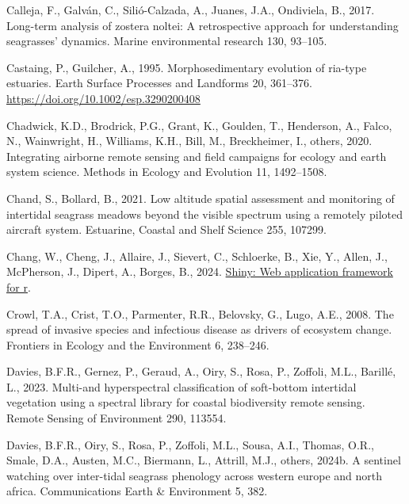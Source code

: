 \documentclass[
  letterpaper,
  DIV=11,
  numbers=noendperiod]{scrartcl}
\newlength{\cslhangindent}
\newenvironment{CSLReferences}[2] %
 {\begin{list}{}{%
  \setlength{\itemindent}{0pt}
  \setlength{\leftmargin}{0pt}
  \setlength{\parsep}{0pt}
  \ifodd #1
   \setlength{\leftmargin}{\cslhangindent}
   \setlength{\itemindent}{-1\cslhangindent}
  \fi
  \setlength{\itemsep}{#2\baselineskip}}}
 {\end{list}}
\begin{document}
\begin{CSLReferences}{1}{0}
Calleja, F., Galván, C., Silió-Calzada, A., Juanes, J.A., Ondiviela, B.,
2017. Long-term analysis of zostera noltei: A retrospective approach for
understanding seagrasses' dynamics. Marine environmental research 130,
93--105.

Castaing, P., Guilcher, A., 1995. Morphosedimentary evolution of
ria-type estuaries. Earth Surface Processes and Landforms 20, 361--376.
\url{https://doi.org/10.1002/esp.3290200408}

Chadwick, K.D., Brodrick, P.G., Grant, K., Goulden, T., Henderson, A.,
Falco, N., Wainwright, H., Williams, K.H., Bill, M., Breckheimer, I.,
others, 2020. Integrating airborne remote sensing and field campaigns
for ecology and earth system science. Methods in Ecology and Evolution
11, 1492--1508.

Chand, S., Bollard, B., 2021. Low altitude spatial assessment and
monitoring of intertidal seagrass meadows beyond the visible spectrum
using a remotely piloted aircraft system. Estuarine, Coastal and Shelf
Science 255, 107299.

Chang, W., Cheng, J., Allaire, J., Sievert, C., Schloerke, B., Xie, Y.,
Allen, J., McPherson, J., Dipert, A., Borges, B., 2024.
\href{https://CRAN.R-project.org/package=shiny}{Shiny: Web application
framework for r}.

Crowl, T.A., Crist, T.O., Parmenter, R.R., Belovsky, G., Lugo, A.E.,
2008. The spread of invasive species and infectious disease as drivers
of ecosystem change. Frontiers in Ecology and the Environment 6,
238--246.

Davies, B.F.R., Gernez, P., Geraud, A., Oiry, S., Rosa, P., Zoffoli,
M.L., Barillé, L., 2023. Multi-and hyperspectral classification of
soft-bottom intertidal vegetation using a spectral library for coastal
biodiversity remote sensing. Remote Sensing of Environment 290, 113554.

Davies, B.F.R., Oiry, S., Rosa, P., Zoffoli, M.L., Sousa, A.I., Thomas,
O.R., Smale, D.A., Austen, M.C., Biermann, L., Attrill, M.J., others,
2024b. A sentinel watching over inter-tidal seagrass phenology across
western europe and north africa. Communications Earth \& Environment 5,
382.


\end{CSLReferences}
\end{document}
